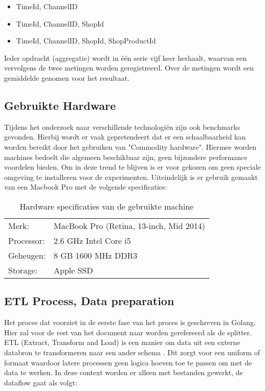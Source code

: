 \begin{itemize}
    \item TimeId, ChannelID
    \item TimeId, ChannelID, ShopId
    \item TimeId, ChannelID, ShopId, ShopProductId
\end{itemize}

Ieder opdracht (aggregatie) wordt in één serie vijf keer herhaalt, waarvan een vervolgens de twee metingen worden geregistreerd. Over de metingen wordt een gemiddelde genomen voor het resultaat.

\subsection{Gebruikte Hardware}
\label{subsec:hardware_specs}

Tijdens het onderzoek naar verschillende technologiën zijn ook benchmarks gevonden. Hierbij wordt er vaak gepretendeert dat er een schaalbaarheid kan worden bereikt door het gebruiken van "Commodity hardware". Hiermee worden machines bedoelt die algemeen beschikbaar zijn, geen bijzondere performance voordelen bieden. Om in deze trend te blijven is er voor gekozen om geen speciale omgeving te installeren voor de experimenten. Uiteindelijk is er gebruik gemaakt van een Macbook Pro met de volgende specificaties:

\begin{table}[h]
\caption{Hardware specificaties van de gebruikte machine}
\label{tab:hardware_specs}
\begin{tabular}{ll}
Merk:      & MacBook Pro (Retina, 13-inch, Mid 2014) \\
Processor: & 2.6 GHz Intel Core i5                   \\
Geheugen:  & 8 GB 1600 MHz DDR3                      \\
Storage:   & Apple SSD                                  
\end{tabular}
\end{table}

\subsection{ETL Process, Data preparation}

Het proces dat voorziet in de eerste fase van het proces is geschreven in Golang. Hier zal voor de rest van het document naar worden gerefereerd als de splitter. ETL (Extract, Transform and Load) is een manier om data uit een externe databron te transformeren naar een ander schema   \parencite{data-mining}. Dit zorgt voor een uniform of formaat waardoor latere processen geen logica hoeven toe te passen om met de data te werken. In deze context worden er alleen met bestanden gewerkt, de dataflow gaat als volgt:

